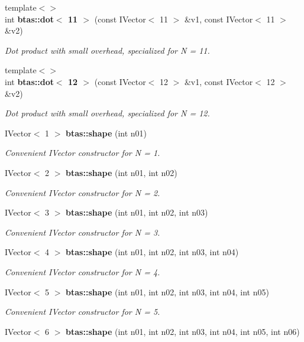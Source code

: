 \begin{DoxyCompactItemize}
{\footnotesize template$<$$>$ }\\int {\bf btas\-::dot$<$ 11 $>$} (const I\-Vector$<$ 11 $>$ \&v1, const I\-Vector$<$ 11 $>$ \&v2)
\begin{DoxyCompactList}\small\item\em Dot product with small overhead, specialized for N = 11. \end{DoxyCompactList}\item 
{\footnotesize template$<$$>$ }\\int {\bf btas\-::dot$<$ 12 $>$} (const I\-Vector$<$ 12 $>$ \&v1, const I\-Vector$<$ 12 $>$ \&v2)
\begin{DoxyCompactList}\small\item\em Dot product with small overhead, specialized for N = 12. \end{DoxyCompactList}\item 
I\-Vector$<$ 1 $>$ {\bf btas\-::shape} (int n01)
\begin{DoxyCompactList}\small\item\em Convenient I\-Vector constructor for N = 1. \end{DoxyCompactList}\item 
I\-Vector$<$ 2 $>$ {\bf btas\-::shape} (int n01, int n02)
\begin{DoxyCompactList}\small\item\em Convenient I\-Vector constructor for N = 2. \end{DoxyCompactList}\item 
I\-Vector$<$ 3 $>$ {\bf btas\-::shape} (int n01, int n02, int n03)
\begin{DoxyCompactList}\small\item\em Convenient I\-Vector constructor for N = 3. \end{DoxyCompactList}\item 
I\-Vector$<$ 4 $>$ {\bf btas\-::shape} (int n01, int n02, int n03, int n04)
\begin{DoxyCompactList}\small\item\em Convenient I\-Vector constructor for N = 4. \end{DoxyCompactList}\item 
I\-Vector$<$ 5 $>$ {\bf btas\-::shape} (int n01, int n02, int n03, int n04, int n05)
\begin{DoxyCompactList}\small\item\em Convenient I\-Vector constructor for N = 5. \end{DoxyCompactList}\item 
I\-Vector$<$ 6 $>$ {\bf btas\-::shape} (int n01, int n02, int n03, int n04, int n05, int n06)

\end{DoxyCompactItemize}
